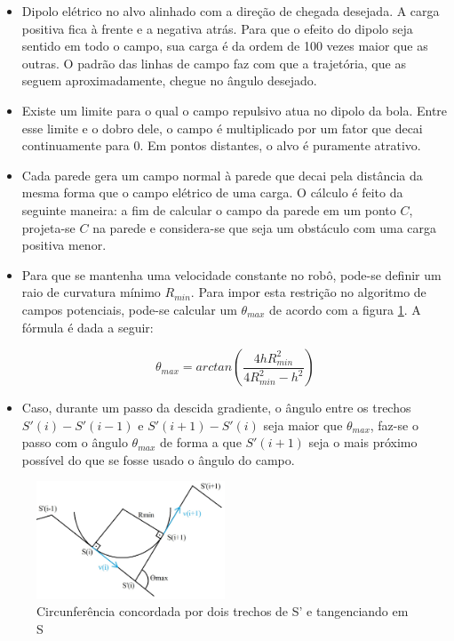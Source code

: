 \documentclass[a4paper,12pt]{article}
\begin{document}
\begin{itemize}
\item Dipolo elétrico no alvo alinhado com a direção de chegada desejada. A carga positiva fica à frente e a negativa atrás. Para que o efeito do dipolo seja sentido em todo o campo, sua carga é da ordem de 100 vezes maior que as outras. O padrão das linhas de campo faz com que a trajetória, que as seguem aproximadamente, chegue no ângulo desejado.
\item Existe um limite para o qual o campo repulsivo atua no dipolo da bola. Entre esse limite e o dobro dele, o campo é multiplicado por um fator que decai continuamente para 0. Em pontos distantes, o alvo é puramente atrativo.
\item Cada parede gera um campo normal à parede que decai pela distância da mesma forma que o campo elétrico de uma carga. O cálculo é feito da seguinte maneira: a fim de calcular o campo da parede em um ponto $C$, projeta-se $C$ na parede e considera-se que seja um obstáculo com uma carga positiva menor.
\item Para que se mantenha uma velocidade constante no robô, pode-se definir um raio de curvatura mínimo $R_{min}$. Para impor esta restrição no algoritmo de campos potenciais, pode-se calcular um $\theta_{max}$ de acordo com a figura \ref{fig: concordancia}. A fórmula é dada a seguir:

\begin{equation}
\theta_{max} = arctan(\frac{4hR_{min}^2}{4R_{min}^2 - h^2})
\end{equation}

\item Caso, durante um passo da descida gradiente, o ângulo entre os trechos $S'(i) - S'(i-1)$ e $S'(i+1) - S'(i)$ seja maior que $\theta_{max}$, faz-se o passo com o ângulo $\theta_{max}$ de forma a que $S'(i+1)$ seja o mais próximo possível do que se fosse usado o ângulo do campo.
\end{itemize}

\begin{figure}
	\label{fig: concordancia}
	\centering
	\includegraphics[width=0.5\textwidth]{figures/thetamax.jpg}
   \caption{Circunferência concordada por dois trechos de S' e tangenciando em S}
\end{figure}
\end{document}
